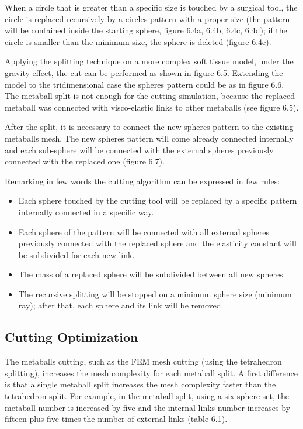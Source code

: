 \documentclass[journal]{vgtc}                %
\begin{document}
When a circle that is greater than a specific size is touched by a surgical tool, the
circle is replaced recursively by a circles pattern with a proper size (the pattern will
be contained inside the starting sphere, figure 6.4a, 6.4b, 6.4c, 6.4d); if the circle is
smaller than the minimum size, the sphere is deleted (figure 6.4e).

Applying the splitting technique on a more complex soft tissue model, under the
gravity effect, the cut can be performed as shown in figure 6.5. Extending the model to the tridimensional case the spheres pattern could be as in figure 6.6. The metaball split is not enough for the cutting simulation, because the replaced metaball was connected with visco-elastic links to other metaballs (see figure 6.5).

After the split, it is necessary to connect the new spheres pattern to the existing
metaballs mesh. The new spheres pattern will come already connected internally and
each sub-sphere will be connected with the external spheres previously connected
with the replaced one (figure 6.7).

Remarking in few words the cutting algorithm can be expressed in few rules:

\begin{itemize}
\item Each sphere touched by the cutting tool will be replaced by a specific pattern
internally connected in a specific way.
\item Each sphere of the pattern will be connected with all external spheres
previously connected with the replaced sphere and the elasticity constant will
be subdivided for each new link.
\item The mass of a replaced sphere will be subdivided between all new spheres.

\item The recursive splitting will be stopped on a minimum sphere size (minimum
ray); after that, each sphere and its link will be removed. 
 
\end{itemize}  

\subsection{Cutting Optimization}

The metaballs cutting, such as the FEM mesh cutting (using the tetrahedron
splitting), increases the mesh complexity for each metaball split. A first difference is
that a single metaball split increases the mesh complexity faster than the tetrahedron
split. For example, in the metaball split, using a six sphere set, the metaball number
is increased by five and the internal links number increases by fifteen plus five times
the number of external links (table 6.1).
\end{document}
